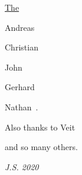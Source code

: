 \smallskip

\noindent \uline{The }

\smallskip
Andreas~

Chris\-tian~

John~

Gerhard~

Nathan~.

\medskip

Also thanks to Veit~

and so many others.

\bigskip
\Heart

\medskip
\hfill \emph{J.S. 2020}